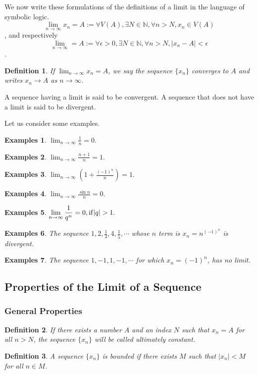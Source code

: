 \documentclass[a4paper,12pt]{article} %
\newtheorem{definition}{Definition}[section]
\newtheorem{example}{Examples}
\begin{document}
We now write these formulations of the definitions of a limit in the 
language of symbolic logic.
\[\lim_{n \to \infty} x_n = A := \forall V(A), \exists N \in \mathbb{N}, \forall n>N, x_n \in V(A)\],
and respectively
\[\lim_{n \to \infty } = A := \forall \epsilon >0, \exists N\in \mathbb{N}, \forall n>N, |x_n - A|<\epsilon\].
\begin{definition}
    If $\displaystyle \lim_{n \to \infty} x_n = A$, we say the sequence $\{x_n\}$ 
    converges to $A$ and writes $x_n \to A$ as $n \to \infty$.
\end{definition}

A sequence having a limit is said to be convergent. A sequence that does not 
have a limit is said to be divergent.

Let us consider some examples.
\begin{example}
    $\displaystyle \lim_{n \to \infty} \frac{1}{n} = 0.$
\end{example}
\begin{example}
    $\displaystyle \lim_{n \to \infty} \frac{n+1}{n} = 1.$
\end{example}
\begin{example}
    $\displaystyle \lim_{n \to \infty} \left( 1+\frac{(-1)^n}{n}\right) = 1.$
\end{example}
\begin{example}
    $\displaystyle \lim_{n \to \infty} \frac{\sin n}{n} = 0.$
\end{example}
\begin{example}
    $\displaystyle \lim_{n \to \infty} \frac{1}{q^n} = 0, {\rm if } |q|>1.$
\end{example}
\begin{example}
    The sequence $1, 2, \frac{1}{3}, 4, \frac{1}{5}, \cdots$ whose $n$
    term is $\displaystyle x_n = n^{(-1)^n}$ is divergent. 
\end{example}
\begin{example}
    The sequence $1, -1, 1, -1, \cdots$ for which $x_n = (-1)^n$, has no limit.
\end{example}

\subsection{Properties of the Limit of a Sequence}
\subsubsection{General Properties}
\begin{definition}
    If there exists a number $A$ and an index $N$ such that $x_n = A$
    for all $n>N$, the sequence $\{x_n\}$ will be called ultimately 
    constant.
\end{definition}
\begin{definition}
    A sequence $\{x_n\}$ is bounded if there exists $M$ such that $|x_n| < M$
    for all $n \in M$.
\end{definition}
\end{document}
